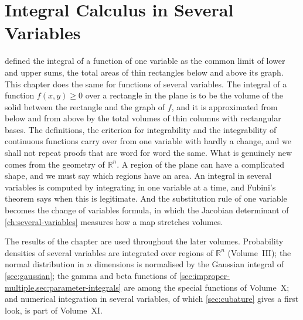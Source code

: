 \chapter{Integral Calculus in Several Variables}
\label{ch:multiple-integrals}


 defined the integral of a function of one variable as the common limit of lower and upper sums, the total areas of thin rectangles below and above its graph. This chapter does the same for functions of several variables. The integral of a function $f(x,y)\ge0$ over a rectangle in the plane is to be the volume of the solid between the rectangle and the graph of $f$, and it is approximated from below and from above by the total volumes of thin columns with rectangular bases. The definitions, the criterion for integrability and the integrability of continuous functions carry over from one variable with hardly a change, and we shall not repeat proofs that are word for word the same. What is genuinely new comes from the geometry of $\mathbb R^n$. A region of the plane can have a complicated shape, and we must say which regions have an area. An integral in several variables is computed by integrating in one variable at a time, and Fubini's theorem says when this is legitimate. And the substitution rule of one variable becomes the change of variables formula, in which the Jacobian determinant of \cref{ch:several-variables} measures how a map stretches volumes.

The results of the chapter are used throughout the later volumes. Probability densities of several variables are integrated over regions of $\mathbb R^n$ (Volume~III); the normal distribution in $n$ dimensions is normalised by the Gaussian integral of \cref{sec:gaussian}; the gamma and beta functions of \cref{sec:improper-multiple,sec:parameter-integrals} are among the special functions of Volume~X; and numerical integration in several variables, of which \cref{sec:cubature} gives a first look, is part of Volume~XI.

